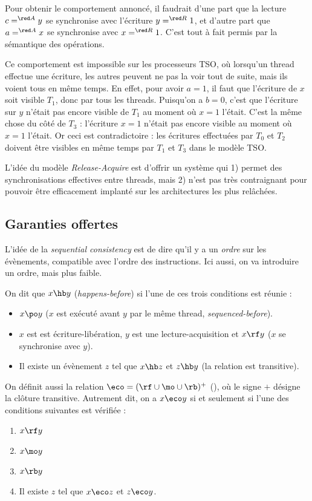 Pour obtenir le comportement annoncé, il faudrait d'une part que la lecture
$c =^{\red A} y$ se synchronise avec l'écriture $y =^{\red R} 1$, et d'autre
part que $a =^{\red A} x$ se synchronise avec $x =^{\red R} 1$. C'est tout à
fait permis par la sémantique des opérations.

Ce comportement est impossible sur les processeurs TSO, où lorsqu'un thread
effectue une écriture, les autres peuvent ne pas la voir tout de suite, mais ils
voient tous en même temps. En effet, pour avoir $a=1$, il faut que l'écriture de
$x$ soit visible $T_1$, donc par tous les threads. Puisqu'on a $b = 0$, c'est
que l'écriture sur $y$ n'était pas encore visible de $T_1$ au moment où $x=1$
l'était. C'est la même chose du côté de $T_3$ : l'écriture $x=1$ n'était pas
encore visible au moment où $x=1$ l'était. Or ceci est contradictoire : les
écritures effectuées par $T_0$ et $T_2$ doivent être visibles en même temps par
$T_1$ et $T_3$ dans le modèle TSO.

L'idée du modèle \emph{Release-Acquire} est d'offrir un système qui 1) permet
des synchronisations effectives entre threads, mais 2) n'est pas très
contraignant pour pouvoir être efficacement implanté sur les architectures les
plus relâchées.

\subsection{Garanties offertes}

L'idée de la \emph{sequential consistency} est de dire qu'il y a un \emph{ordre}
sur les évènements, compatible avec l'ordre des instructions. Ici aussi, on va
introduire un ordre, mais plus faible.

On dit que $x \hb y$ (\og \emph{happens-before}\fg{}) si l'une de ces trois conditions est réunie :
\begin{itemize}
\item $x \po y$ ($x$ est exécuté avant $y$ par le même thread, \emph{sequenced-before}).
\item $x$ est est écriture-libération, $y$ est une lecture-acquisition et $x \rf y$ (\og $x$ se synchronise avec $y$\fg).
\item Il existe un évènement $z$ tel que $x \hb z$ et $z \hb y$ (la relation est transitive).
\end{itemize}

On définit aussi la relation $\eco = (\rf \cup \mo \cup \rb)^{+}$
(), où le signe $+$ désigne la clôture
transitive. Autrement dit, on a $x \eco y$ si et seulement si l'une des
conditions suivantes est vérifiée :
\begin{enumerate}[$i$)]
\item $x \rf y$
\item $x \mo y$
\item $x \rb y$
\item Il existe $z$ tel que $x \eco z$ et $z \eco y$.
\end{enumerate}

